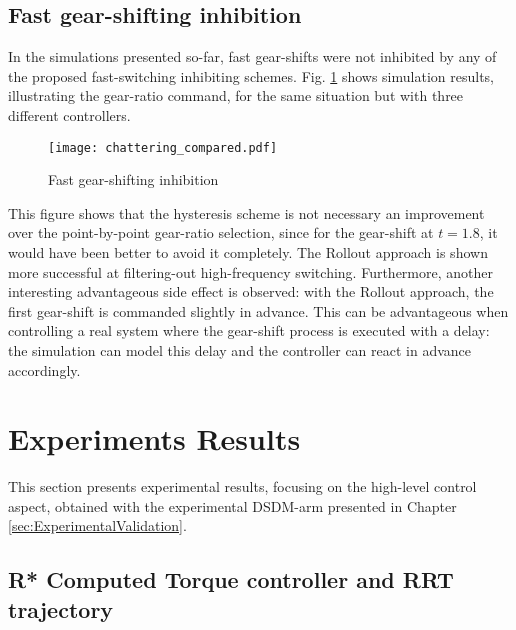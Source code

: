 \subsection{Fast gear-shifting inhibition}

In the simulations presented so-far, fast gear-shifts were not inhibited by any of the proposed fast-switching inhibiting schemes. Fig. \ref{fig:ChatteringComparaison} shows simulation results, illustrating the gear-ratio command, for the same situation but with three different controllers. 
%
\begin{figure}[htp]
	\centering
		\texttt{[image: chattering\_compared.pdf]}
	\caption{Fast gear-shifting inhibition}
	\label{fig:ChatteringComparaison}
\end{figure}

This figure shows that the hysteresis scheme is not necessary an improvement over the point-by-point gear-ratio selection, since for the gear-shift at $t=1.8$, it would have been better to avoid it completely. The Rollout approach is shown more successful at filtering-out high-frequency switching. Furthermore, another interesting advantageous side effect is observed: with the Rollout approach, the first gear-shift is commanded slightly in advance. This can be advantageous when controlling a real system where the gear-shift process is executed with a delay: the simulation can model this delay and the controller can react in advance accordingly.




\newpage
\section{Experiments Results}
\label{sec:shift_exp}

This section presents experimental results, focusing on the high-level control aspect, obtained with the experimental DSDM-arm presented in Chapter \ref{sec:ExperimentalValidation}.

\subsection{R* Computed Torque controller and RRT trajectory}


